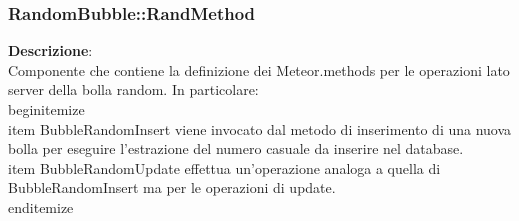 \clearpage

\subsubsection{RandomBubble::RandMethod}
\textbf{Descrizione}:\\
 Componente che contiene la definizione dei Meteor.methods per le operazioni lato server della bolla random.  In particolare:
\\begin{itemize}
\\item BubbleRandomInsert viene invocato dal metodo di inserimento di una nuova bolla per eseguire l'estrazione del numero casuale da inserire nel database.
\\item  BubbleRandomUpdate effettua un'operazione analoga a quella di BubbleRandomInsert ma per le operazioni di update.
\\end{itemize} 


